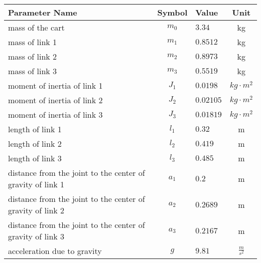 \begin{tabular}{lclc}
\hline
 Parameter Name                                             &  Symbol  & Value     &      Unit       \\
\hline
 mass of the cart                                           & $m_{0}$  & $3.34$    &       kg        \\
 mass of link 1                                             & $m_{1}$  & $0.8512$  &       kg        \\
 mass of link 2                                             & $m_{2}$  & $0.8973$  &       kg        \\
 mass of link 3                                             & $m_{3}$  & $0.5519$  &       kg        \\
 moment of inertia of link 1                                & $J_{1}$  & $0.0198$  & $kg \cdot m^2$  \\
 moment of inertia of link 2                                & $J_{2}$  & $0.02105$ & $kg \cdot m^2$  \\
 moment of inertia of link 3                                & $J_{3}$  & $0.01819$ & $kg \cdot m^2$  \\
 length of link 1                                           & $l_{1}$  & $0.32$    &        m        \\
 length of link 2                                           & $l_{2}$  & $0.419$   &        m        \\
 length of link 3                                           & $l_{3}$  & $0.485$   &        m        \\
 distance from the joint to the center of gravity of link 1 & $a_{1}$  & $0.2$     &        m        \\
 distance from the joint to the center of gravity of link 2 & $a_{2}$  & $0.2689$  &        m        \\
 distance from the joint to the center of gravity of link 3 & $a_{3}$  & $0.2167$  &        m        \\
 acceleration due to gravity                                &   $g$    & $9.81$    & $\frac{m}{s^2}$ \\
\hline
\end{tabular}